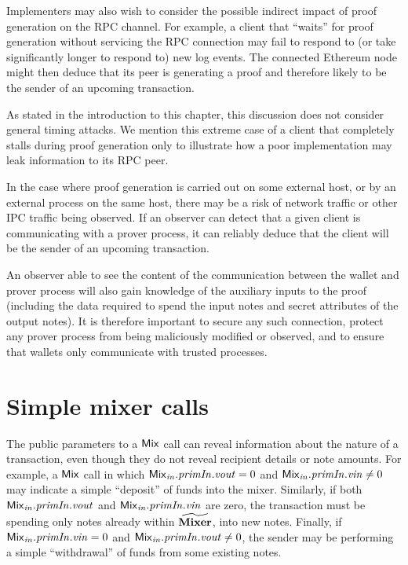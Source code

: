 Implementers may also wish to consider the possible indirect impact of proof generation on the RPC channel. For example, a client that ``waits'' for proof generation without servicing the RPC connection may fail to respond to (or take significantly longer to respond to) new log events. The connected Ethereum node might then deduce that its peer is generating a proof and therefore likely to be the sender of an upcoming transaction.

\begin{notebox}
As stated in the introduction to this chapter, this discussion does not consider general timing attacks. We mention this extreme case of a client that completely stalls during proof generation only to illustrate how a poor implementation may leak information to its RPC peer.
\end{notebox}

In the case where proof generation is carried out on some external host, or by an external process on the same host, there may be a risk of network traffic or other IPC traffic being observed. If an observer can detect that a given client is communicating with a prover process, it can reliably deduce that the client will be the sender of an upcoming transaction.

An observer able to see the content of the communication between the wallet and prover process will also gain knowledge of the auxiliary inputs to the proof (including the data required to spend the input notes and secret attributes of the output notes).  It is therefore important to secure any such connection, protect any prover process from being maliciously modified or observed, and to ensure that wallets only communicate with trusted processes.

\section{Simple mixer calls}

The public parameters to a $\mathsf{Mix}$ call can reveal information about the nature of a transaction, even though they do not reveal recipient details or note amounts. For example, a $\mathsf{Mix}$ call in which $\mathit{{\mathsf{Mix}}_{in}}.\mathit{primIn}.\mathit{vout} = 0$ and $\mathit{{\mathsf{Mix}}_{in}}.\mathit{primIn}.\mathit{vin} \neq 0$ may indicate a simple ``deposit'' of funds into the mixer.  Similarly, if both $\mathit{{\mathsf{Mix}}_{in}}.\mathit{primIn}.\mathit{vout}$ and $\mathit{{\mathsf{Mix}}_{in}}.\mathit{primIn}.\mathit{vin}$ are zero, the transaction must be spending only notes already within $\widetilde{\mathbf{Mixer}}$, into new notes.  Finally, if $\mathit{{\mathsf{Mix}}_{in}}.\mathit{primIn}.\mathit{vin} = 0$ and $\mathit{{\mathsf{Mix}}_{in}}.\mathit{primIn}.\mathit{vout} \neq 0$, the sender may be performing a simple ``withdrawal'' of funds from some existing notes.

